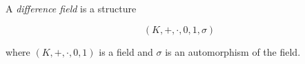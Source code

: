 A \textit{difference field} is a structure

$$(K, +, \cdot, 0, 1, \sigma)$$

where $(K, +, \cdot, 0, 1)$ is a field and $\sigma$ is an automorphism of the field.
